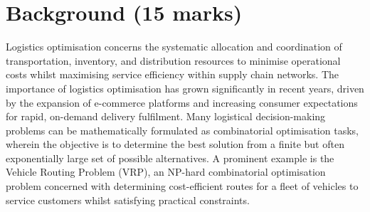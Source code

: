 \graphicspath{{content/chapters/2_background/figures/}}

\chapter{Background (15 marks)}%
\label{chp:background}











Logistics optimisation concerns the systematic allocation and coordination of
transportation, inventory, and distribution resources to minimise operational
costs whilst maximising service efficiency within supply chain networks. The
importance of logistics optimisation has grown significantly in recent years,
driven by the expansion of e-commerce platforms and increasing consumer
expectations for rapid, on-demand delivery fulfilment. Many logistical
decision-making problems can be mathematically formulated as combinatorial
optimisation tasks, wherein the objective is to determine the best solution from
a finite but often exponentially large set of possible alternatives. A prominent
example is the Vehicle Routing Problem (VRP), an NP-hard combinatorial
optimisation problem concerned with determining cost-efficient routes for a
fleet of vehicles to service customers whilst satisfying practical constraints.

